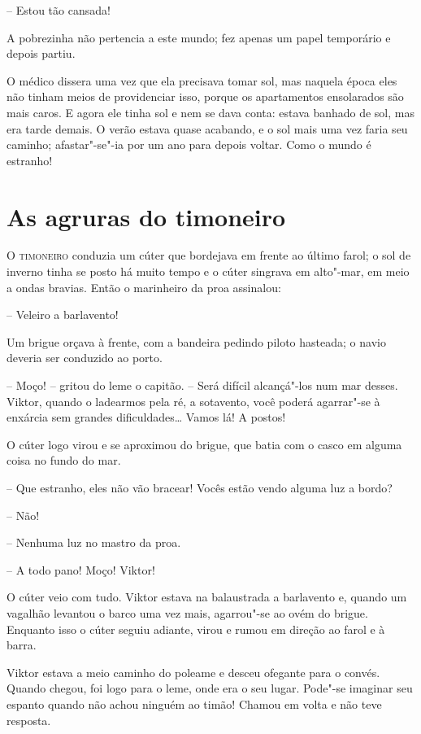 -- Estou tão cansada!

A pobrezinha não pertencia a este mundo; fez apenas um papel temporário
e depois partiu.

O médico dissera uma vez que ela precisava tomar sol, mas naquela época
eles não tinham meios de providenciar isso, porque os apartamentos
ensolarados são mais caros.
\pagebreak
E agora ele tinha sol e nem se dava conta: estava banhado de sol, mas
era tarde demais. O verão estava quase acabando, e o sol mais uma vez  \EP[]
faria seu caminho; afastar"-se"-ia por um ano para depois voltar.
Como o mundo é estranho!

\chapter{As agruras do timoneiro}


\textsc{O timoneiro} conduzia um cúter que bordejava em frente ao último farol; o
sol de inverno tinha se posto há muito tempo e o cúter singrava em
alto"-mar, em meio a ondas bravias. Então o marinheiro da proa
assinalou: 

-- Veleiro a barlavento!

Um brigue orçava à frente, com a bandeira pedindo piloto hasteada; o navio
deveria ser conduzido ao porto.

-- Moço! -- gritou do leme o capitão. -- Será difícil alcançá"-los num mar
desses. Viktor, quando o ladearmos pela ré, a sotavento, você
poderá agarrar"-se à enxárcia sem grandes dificuldades\ldots{} Vamos lá! A
postos!

O cúter logo virou e se aproximou do brigue, que batia com o casco em
alguma coisa no fundo do mar.

-- Que estranho, eles não vão bracear! Vocês estão vendo alguma luz a bordo? 

-- Não! 

-- Nenhuma luz no mastro da proa.

-- A todo pano! Moço! Viktor!

O cúter veio com tudo. Viktor estava na balaustrada a barlavento e,
quando um vagalhão levantou o barco uma vez mais, agarrou"-se ao ovém
do brigue. Enquanto isso o cúter seguiu adiante, virou e rumou em
direção ao farol e à barra.

Viktor estava a meio caminho do poleame e desceu ofegante para o convés.
Quando chegou, foi logo para o leme, onde era o seu lugar. Pode"-se
imaginar seu espanto quando não achou ninguém ao timão! Chamou em volta
e não teve resposta.

